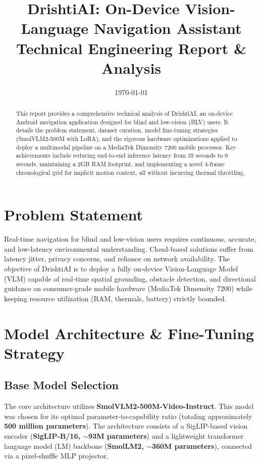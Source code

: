 \documentclass[11pt,a4paper]{article}
\title{\textbf{DrishtiAI: On-Device Vision-Language Navigation Assistant}\\ \large Technical Engineering Report \& Analysis}
\author{}
\date{\today}
\begin{document}
\maketitle

\begin{abstract}
This report provides a comprehensive technical analysis of DrishtiAI, an on-device Android navigation application designed for blind and low-vision (BLV) users. It details the problem statement, dataset curation, model fine-tuning strategies (SmolVLM2-500M with LoRA), and the rigorous hardware optimizations applied to deploy a multimodal pipeline on a MediaTek Dimensity 7200 mobile processor. Key achievements include reducing end-to-end inference latency from 35 seconds to 9 seconds, maintaining a 2GB RAM footprint, and implementing a novel 4-frame chronological grid for implicit motion context, all without incurring thermal throttling.
\end{abstract}

\tableofcontents
\newpage

\section{Problem Statement}
Real-time navigation for blind and low-vision users requires continuous, accurate, and low-latency environmental understanding. Cloud-based solutions suffer from latency jitter, privacy concerns, and reliance on network availability. The objective of DrishtiAI is to deploy a fully on-device Vision-Language Model (VLM) capable of real-time spatial grounding, obstacle detection, and directional guidance on consumer-grade mobile hardware (MediaTek Dimensity 7200) while keeping resource utilization (RAM, thermals, battery) strictly bounded.

\section{Model Architecture \& Fine-Tuning Strategy}

\subsection{Base Model Selection}
The core architecture utilizes \textbf{SmolVLM2-500M-Video-Instruct}. This model was chosen for its optimal parameter-to-capability ratio (totaling approximately \textbf{500 million parameters}). The architecture consists of a SigLIP-based vision encoder (\textbf{SigLIP-B/16, $\sim$93M parameters}) and a lightweight transformer language model (LM) backbone (\textbf{SmolLM2, $\sim$360M parameters}), connected via a pixel-shuffle MLP projector.
\end{document}
